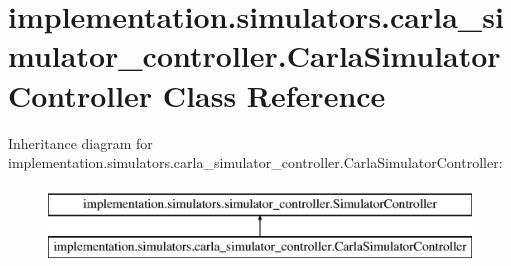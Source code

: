 \hypertarget{classimplementation_1_1simulators_1_1carla__simulator__controller_1_1_carla_simulator_controller}{}\section{implementation.\+simulators.\+carla\+\_\+simulator\+\_\+controller.\+Carla\+Simulator\+Controller Class Reference}
\label{classimplementation_1_1simulators_1_1carla__simulator__controller_1_1_carla_simulator_controller}
Inheritance diagram for implementation.\+simulators.\+carla\+\_\+simulator\+\_\+controller.\+Carla\+Simulator\+Controller\+:\begin{figure}[H]
\begin{center}
\leavevmode
\includegraphics[height=2.000000cm]{classimplementation_1_1simulators_1_1carla__simulator__controller_1_1_carla_simulator_controller}
\end{center}
\end{figure}
